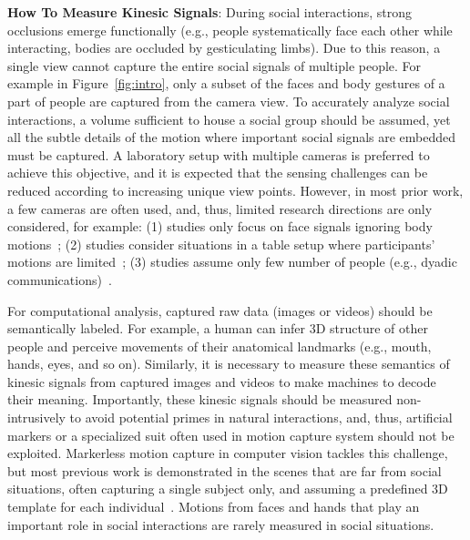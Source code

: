 \noindent \textbf{How To Measure Kinesic Signals}:  
During social interactions, strong occlusions emerge functionally (e.g., people systematically face each other while interacting, bodies are occluded by gesticulating limbs). Due to this reason, a single view cannot capture the entire social signals of multiple people. For example in Figure~\ref{fig:intro}, only a subset of the faces and body gestures of a part of people are captured from the camera view. To accurately analyze social interactions, a volume sufficient to house a social group should be assumed, yet all the subtle details of the motion where important social signals are embedded must be captured. A laboratory setup with multiple cameras is preferred to achieve this objective, and it is expected that the sensing challenges can be reduced according to increasing unique view points. However, in most prior work, a few cameras are often used, and, thus, limited research directions are only considered, for example: (1) studies only focus on face signals ignoring body motions~\cite{messinger2009automated, lucas_trust_2016,mckeown2012semaine}; (2) studies consider situations in a table setup where participants' motions are limited~\cite{carletta2005ami, Lepri-12,messinger2009automated, nojavanasghari2016emoreact, lucas_trust_2016,mckeown2012semaine}; (3) studies assume only few number of people (e.g., dyadic communications)~\cite{messinger2009automated,nojavanasghari2016emoreact, lucas_trust_2016, katsimerou2016crowdsourcing,mckeown2012semaine,gunes2006bimodal}.

For computational analysis, captured raw data (images or videos) should be semantically labeled. For example, a human can infer 3D structure of other people and perceive movements of their anatomical landmarks (e.g., mouth, hands, eyes, and so on). Similarly, it is necessary to measure these semantics of kinesic signals from captured images and videos to make machines to decode their meaning. Importantly, these kinesic signals should be measured non-intrusively to avoid potential primes in natural interactions, and, thus, artificial markers or a specialized suit often used in motion capture system should not be exploited. Markerless motion capture in computer vision tackles this challenge, but most previous work is demonstrated in the scenes that are far from social situations, often capturing a single subject only, and assuming a predefined 3D template for each individual~\cite{Gall-09, Vlasic-08, Brox-10, Stoll-11, deAguiar-2008, Vlasic-2008}. Motions from faces and hands that play an important role in social interactions are rarely measured in social situations.\\


